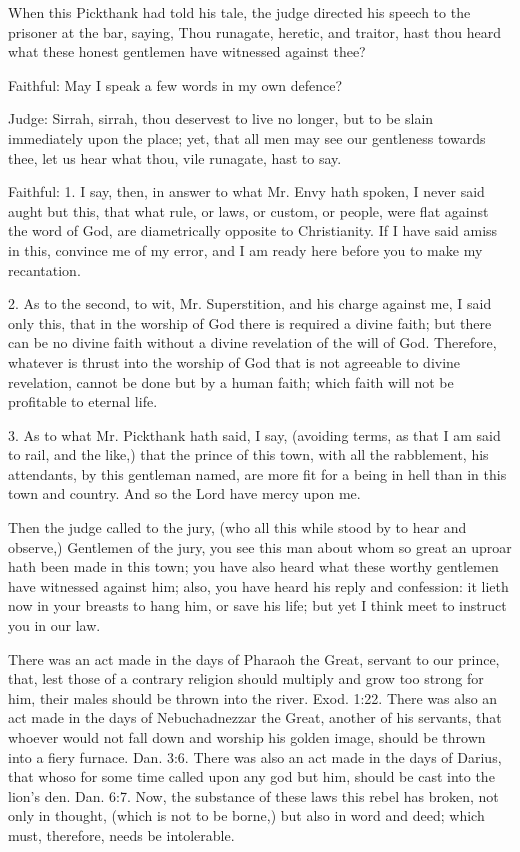 When this Pickthank had told his tale, the judge directed his speech to the prisoner at the bar, saying, Thou runagate, heretic, and traitor, hast thou heard what these honest gentlemen have witnessed against thee?

Faithful: May I speak a few words in my own defence?

Judge: Sirrah, sirrah, thou deservest to live no longer, but to be slain immediately upon the place; yet, that all men may see our gentleness towards thee, let us hear what thou, vile runagate, hast to say.

Faithful: 1. I say, then, in answer to what Mr. Envy hath spoken, I never said aught but this, that what rule, or laws, or custom, or people, were flat against the word of God, are diametrically opposite to Christianity. If I have said amiss in this, convince me of my error, and I am ready here before you to make my recantation.

2. As to the second, to wit, Mr. Superstition, and his charge against me, I said only this, that in the worship of God there is required a divine faith; but there can be no divine faith without a divine revelation of the will of God. Therefore, whatever is thrust into the worship of God that is not agreeable to divine revelation, cannot be done but by a human faith; which faith will not be profitable to eternal life.

3. As to what Mr. Pickthank hath said, I say, (avoiding terms, as that I am said to rail, and the like,) that the prince of this town, with all the rabblement, his attendants, by this gentleman named, are more fit for a being in hell than in this town and country. And so the Lord have mercy upon me.

Then the judge called to the jury, (who all this while stood by to hear and observe,) Gentlemen of the jury, you see this man about whom so great an uproar hath been made in this town; you have also heard what these worthy gentlemen have witnessed against him; also, you have heard his reply and confession: it lieth now in your breasts to hang him, or save his life; but yet I think meet to instruct you in our law.

There was an act made in the days of Pharaoh the Great, servant to our prince, that, lest those of a contrary religion should multiply and grow too strong for him, their males should be thrown into the river. Exod. 1:22. There was also an act made in the days of Nebuchadnezzar the Great, another of his servants, that whoever would not fall down and worship his golden image, should be thrown into a fiery furnace. Dan. 3:6. There was also an act made in the days of Darius, that whoso for some time called upon any god but him, should be cast into the lion's den. Dan. 6:7. Now, the substance of these laws this rebel has broken, not only in thought, (which is not to be borne,) but also in word and deed; which must, therefore, needs be intolerable.

